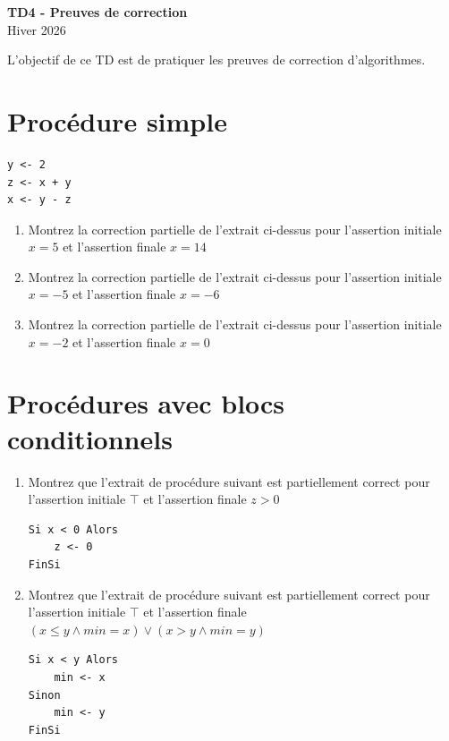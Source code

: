 \documentclass[a4paper,11pt]{article}
\begin{document}
\begin{center}
{\Huge\bfseries TD4 - Preuves de correction} \\[0.5cm]
{\large Hiver 2026} \\[0.3cm]
\end{center}

\vspace{0.5cm}

L'objectif de ce TD est de pratiquer les preuves de correction d'algorithmes.

\section{Procédure simple}

\begin{lstlisting}
y <- 2
z <- x + y
x <- y - z
\end{lstlisting}

\begin{enumerate}
\item Montrez la correction partielle de l'extrait ci-dessus pour l'assertion initiale $x = 5$ et l'assertion finale $x = 14$

\item Montrez la correction partielle de l'extrait ci-dessus pour l'assertion initiale $x = -5$ et l'assertion finale $x = -6$

\item Montrez la correction partielle de l'extrait ci-dessus pour l'assertion initiale $x = -2$ et l'assertion finale $x = 0$
\end{enumerate}

\section{Procédures avec blocs conditionnels}

\begin{enumerate}
\item Montrez que l'extrait de procédure suivant est partiellement correct pour l'assertion initiale $\top$ et l'assertion finale $z > 0$

\begin{lstlisting}
Si x < 0 Alors
    z <- 0
FinSi
\end{lstlisting}

\item Montrez que l'extrait de procédure suivant est partiellement correct pour l'assertion initiale $\top$ et l'assertion finale $(x \leq y \wedge min = x) \vee (x > y \wedge min = y)$

\begin{lstlisting}
Si x < y Alors
    min <- x
Sinon
    min <- y
FinSi
\end{lstlisting}
\end{enumerate}
\end{document}
